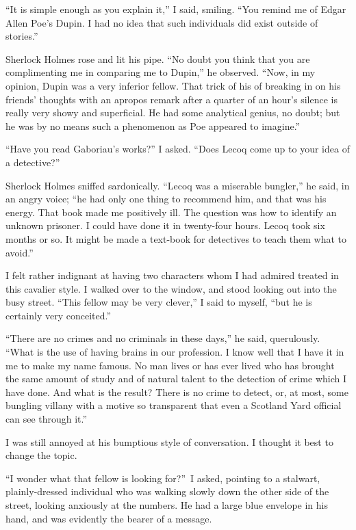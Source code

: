 \documentclass[12pt,english]{book}
\begin{document}
{}``It is simple enough as you explain it,'' I said, smiling. {}``You
remind me of Edgar Allen Poe's Dupin. I had no idea that such individuals
did exist outside of stories.''

Sherlock Holmes rose and lit his pipe. {}``No doubt you think that
you are complimenting me in comparing me to Dupin,'' he observed.
{}``Now, in my opinion, Dupin was a very inferior fellow. That trick
of his of breaking in on his friends' thoughts with an apropos remark
after a quarter of an hour's silence is really very showy and superficial.
He had some analytical genius, no doubt; but he was by no means such
a phenomenon as Poe appeared to imagine.''

{}``Have you read Gaboriau's works?'' I asked. {}``Does Lecoq come
up to your idea of a detective?''

Sherlock Holmes sniffed sardonically. {}``Lecoq was a miserable bungler,''
he said, in an angry voice; {}``he had only one thing to recommend
him, and that was his energy. That book made me positively ill. The
question was how to identify an unknown prisoner. I could have done
it in twenty-four hours. Lecoq took six months or so. It might be
made a text-book for detectives to teach them what to avoid.''

I felt rather indignant at having two characters whom I had admired
treated in this cavalier style. I walked over to the window, and stood
looking out into the busy street. {}``This fellow may be very clever,''
I said to myself, {}``but he is certainly very conceited.''

{}``There are no crimes and no criminals in these days,'' he said,
querulously. {}``What is the use of having brains in our profession.
I know well that I have it in me to make my name famous. No man lives
or has ever lived who has brought the same amount of study and of
natural talent to the detection of crime which I have done. And what
is the result? There is no crime to detect, or, at most, some bungling
villany with a motive so transparent that even a Scotland Yard official
can see through it.''

I was still annoyed at his bumptious style of conversation. I thought
it best to change the topic.

{}``I wonder what that fellow is looking for?''\ I asked, pointing
to a stalwart, plainly-dressed individual who was walking slowly down
the other side of the street, looking anxiously at the numbers. He
had a large blue envelope in his hand, and was evidently the bearer
of a message.
\end{document}
